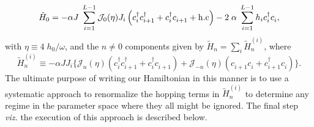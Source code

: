 \documentclass[aps,prl, notitlepage]{revtex4-1}
\begin{document}
\begin{equation}
\label{eq:h0}
\tilde{H}_0  =    -\alpha J\;\sum_{i=1}^{L-1} \mathcal{J}_0(\eta) J_i \left( c^\dagger_i c^\dagger_{i+1} + 						c^\dagger_i c^{\;}_{i+1} + \rm{h.c} \right) -2 \;\alpha\;\sum_{i=1}^{L-1} h_i c^\dagger_i c^{\;}_i,
\end{equation}
with $\eta\equiv4\; h_0/\omega$, and the $n\neq 0$ components given by $\tilde{H}_n   =    \sum_{i}  \tilde{H}^{(i)}_n$, where
\begin{equation}
\label{eq:hn}
\tilde{H}^{(i)}_n   \equiv -\alpha J J_i \bigg\{ \mathcal{J}_n(\eta)  \left( c^\dagger_i 		    c^\dagger_{i+1} + 					c^\dagger_i c^{\;}_{i+1} \right) +\mathcal{J}_{-n}(\eta) \left(c^{\;}_{i+1}c^{\;}_i + 		     						c^\dagger_{i+1} c^{\;}_{i} \right)\bigg\}.
\end{equation}
The ultimate purpose of writing our Hamiltonian in this manner is to use a systematic approach to renormalize the hopping terms in $\tilde{H}^{(i)}_n $ to determine any regime in the parameter space where they all might be ignored. The final step \textit{viz.}
the execution of this approach is described below.
\end{document}
